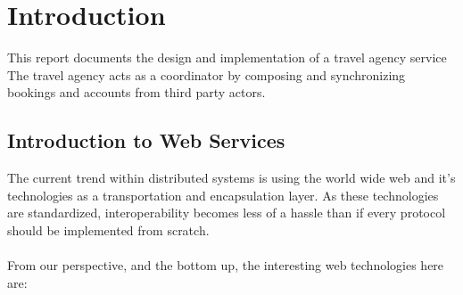 \chapter{Introduction}
This report documents the design and implementation of a travel agency service The travel agency acts as a coordinator by composing and synchronizing bookings and accounts from third party actors.

\section{Introduction to Web Services}
The current trend within distributed systems is using the world wide web and it's technologies as a transportation and encapsulation layer. As these technologies are standardized, interoperability becomes less of a hassle than if every protocol should be implemented from scratch.\\\\
From our perspective, and the bottom up, the interesting web technologies here are:

